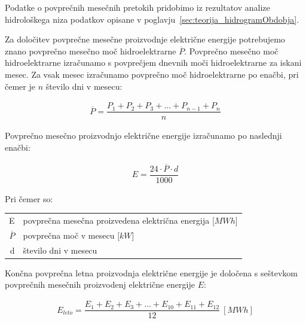  Podatke o povprečnih mesečnih pretokih pridobimo iz rezultatov analize hidrološkega niza podatkov opisane v poglavju~\ref{sec:teorija_hidrogramObdobja}.






Za določitev povprečne mesečne proizvodnje električne energije potrebujemo znano povprečno mesečno moč hidroelektrarne  $\overline{P}$. Povprečno mesečno moč hidroelektrarne izračunamo s povprečjem dnevnih moči hidroelektrarne za iskani mesec. Za vsak mesec izračunamo povprečno moč hidroelektrarne po enačbi, pri čemer je $n$ število dni v mesecu:


\begin{ceqn}
\begin{align}
\overline{P} = \dfrac{P_1 + P_2 + P_3 + ... + P_{n-1} + P_n}{n}
\end{align}
\end{ceqn}



Povprečno mesečno proizvodnjo električne energije izračunamo po naslednji enačbi:

\begin{ceqn}
\begin{align}
E = \dfrac{24 \cdot \overline{P} \cdot d}{1000}
\end{align}
\end{ceqn}

Pri čemer so:
\begin{table}[htb!]
\begin{tabular}{r|p{10cm}}
	E & povprečna mesečna proizvedena električna energija [$MWh$]\\
	$\overline{P}$ & povprečna moč v mesecu [$kW$]\\
	d & število dni v mesecu \\
\end{tabular}
\end{table}


Končna povprečna letna proizvodnja električne energije je določena s seštevkom povprečnih mesečnih proizvodenj električne energije $E$:

\begin{ceqn}
\begin{align}
 E_{leto} =  \dfrac{E_1 + E_2 + E_3 + ... + E_{10} + E_{11} + E_{12}}{12} ~[MWh]
\end{align}
\end{ceqn}

